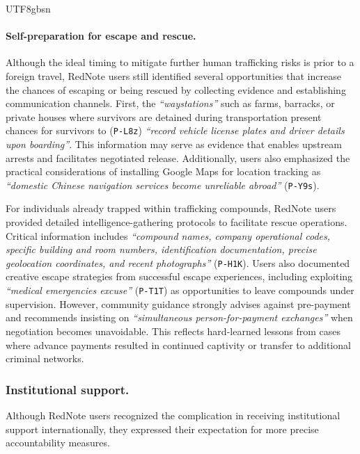 \documentclass[sigconf,nonacm]{acmart}
\begin{document}
\begin{CJK}{UTF8}{gbsn}
\paragraph{\textbf{Self-preparation for escape and rescue.}}
Although the ideal timing to mitigate further human trafficking risks is prior to a foreign travel, RedNote users still identified several opportunities that increase the chances of escaping or being rescued by collecting evidence and establishing communication channels. First, the \textit{``waystations''} such as farms, barracks, or private houses where survivors are detained during transportation present chances for survivors to (\texttt{P-L8z}) \textit{``record vehicle license plates and driver details upon boarding''}. This information may serve as evidence that enables upstream arrests and facilitates negotiated release. Additionally, users also emphasized the practical considerations of installing Google Maps for location tracking as \textit{``domestic Chinese navigation services become unreliable abroad''} (\texttt{P-Y9s}).

For individuals already trapped within trafficking compounds, RedNote users provided detailed intelligence-gathering protocols to facilitate rescue operations. Critical information includes \textit{``compound names, company operational codes, specific building and room numbers, identification documentation, precise geolocation coordinates, and recent photographs''} (\texttt{P-H1K}). Users also documented creative escape strategies from successful escape experiences, including exploiting \textit{``medical emergencies excuse''} (\texttt{P-T1T}) as opportunities to leave compounds under supervision. However, community guidance strongly advises against pre-payment and recommends insisting on \textit{``simultaneous person-for-payment exchanges''} when negotiation becomes unavoidable. This reflects hard-learned lessons from cases where advance payments resulted in continued captivity or transfer to additional criminal networks.

\subsubsection{Institutional support.}  
\label{sec:institutional_support}

Although RedNote users recognized the complication in receiving institutional support internationally, they expressed their expectation for more precise accountability measures.


\end{CJK}
\end{document}
